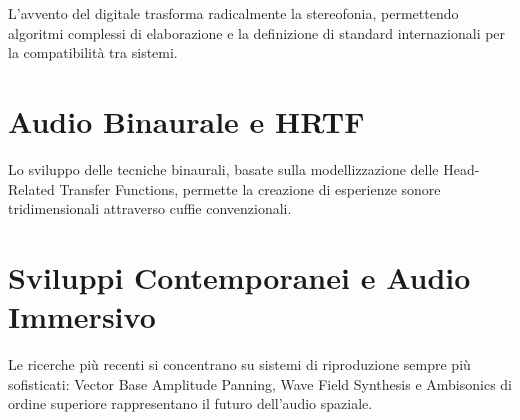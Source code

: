 \documentclass[11pt,a4paper]{article}
\begin{document}
L'avvento del digitale trasforma radicalmente la stereofonia, permettendo algoritmi complessi di elaborazione e la definizione di standard internazionali per la compatibilità tra sistemi.

\nocite{bosi1997}
\nocite{itu2012}

\section{Audio Binaurale e HRTF}

Lo sviluppo delle tecniche binaurali, basate sulla modellizzazione delle Head-Related Transfer Functions, permette la creazione di esperienze sonore tridimensionali attraverso cuffie convenzionali.

\nocite{wightman1989}
\nocite{begault1994}
\nocite{algazi2001}
\nocite{cheng2001}

\section{Sviluppi Contemporanei e Audio Immersivo}

Le ricerche più recenti si concentrano su sistemi di riproduzione sempre più sofisticati: Vector Base Amplitude Panning, Wave Field Synthesis e Ambisonics di ordine superiore rappresentano il futuro dell'audio spaziale.

\nocite{berkhout1993}
\nocite{pulkki1997}
\nocite{daniel2003}
\nocite{frank2013}
\nocite{zotter2019}


\end{document}
